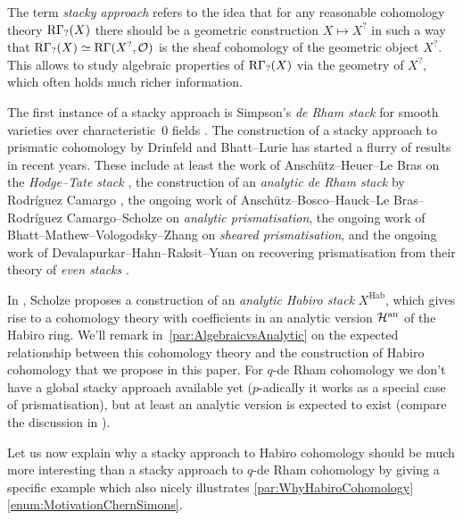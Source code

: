 \documentclass[DIV=12,numbers=enddot,leqno,bibliography=totoc]{scrartcl}
\begin{document}
	\begin{numpar}
		The term \emph{stacky approach} refers to the idea that for any reasonable cohomology theory $\mathrm{R}\Gamma_?(X)$ there should be a geometric construction $X\mapsto X^?$ in such a way that $\mathrm{R}\Gamma_?(X)\simeq \mathrm{R}\Gamma(X^?,\mathcal{O})$ is the sheaf cohomology of the geometric object $X^?$. This allows to study algebraic properties of $\mathrm{R}\Gamma_?(X)$ via the geometry of $X^?$, which often holds much richer information.
		
		The first instance of a stacky approach is Simpson's \emph{de Rham stack} for smooth varieties over characteristic~$0$ fields \cite{SimpsonDeRhamStack}. The construction of a stacky approach to prismatic cohomology by Drinfeld and Bhatt--Lurie \cite{DrinfeldPrismatization,BhattLurieI,BhattLurieII} has started a flurry of results in recent years. These include at least the work of Anschütz--Heuer--Le Bras on the \emph{Hodge--Tate stack} \cite{HodgeTateStack1,HodgeTateStack2,HodgeTateStack3}, the construction of an \emph{analytic de Rham stack} by Rodríguez Camargo \cite{AnalyticDeRhamStack}, the ongoing work of Anschütz--Bosco--Hauck--Le Bras--Rodríguez Camargo--Scholze on \emph{analytic prismatisation}, the ongoing work of Bhatt--Mathew--Vologodsky--Zhang on \emph{sheared prismatisation}, and the ongoing work of Devalapurkar--Hahn--Raksit--Yuan on recovering prismatisation from their theory of \emph{even stacks} \cite{EvenStacks}.
		
		In \cite{HabiroCohomologyLecture}, Scholze proposes a construction of an \emph{analytic Habiro stack} $X^\mathrm{Hab}$, which gives rise to a cohomology theory with coefficients in an analytic version $\mathcal{H}^\mathrm{an}$ of the Habiro ring. We'll remark in~\cref{par:AlgebraicvsAnalytic} on the expected relationship between this cohomology theory and the construction of Habiro cohomology that we propose in this paper. For $q$-de Rham cohomology we don't have a global stacky approach available yet  ($p$-adically it works as a special case of prismatisation), but at least an analytic version is expected to exist (compare the discussion in \cite[\S{}]{qHodge}).
	\end{numpar}
	
	Let us now explain why a stacky approach to Habiro cohomology should be much more interesting than a stacky approach to $q$-de Rham cohomology by giving a specific example which also nicely illustrates \cref{par:WhyHabiroCohomology}\cref{enum:MotivationChernSimons}.
	
\end{document}
